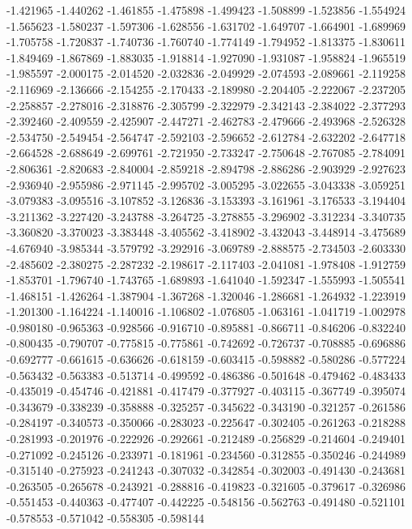 -1.421965
-1.440262
-1.461855
-1.475898
-1.499423
-1.508899
-1.523856
-1.554924
-1.565623
-1.580237
-1.597306
-1.628556
-1.631702
-1.649707
-1.664901
-1.689969
-1.705758
-1.720837
-1.740736
-1.760740
-1.774149
-1.794952
-1.813375
-1.830611
-1.849469
-1.867869
-1.883035
-1.918814
-1.927090
-1.931087
-1.958824
-1.965519
-1.985597
-2.000175
-2.014520
-2.032836
-2.049929
-2.074593
-2.089661
-2.119258
-2.116969
-2.136666
-2.154255
-2.170433
-2.189980
-2.204405
-2.222067
-2.237205
-2.258857
-2.278016
-2.318876
-2.305799
-2.322979
-2.342143
-2.384022
-2.377293
-2.392460
-2.409559
-2.425907
-2.447271
-2.462783
-2.479666
-2.493968
-2.526328
-2.534750
-2.549454
-2.564747
-2.592103
-2.596652
-2.612784
-2.632202
-2.647718
-2.664528
-2.688649
-2.699761
-2.721950
-2.733247
-2.750648
-2.767085
-2.784091
-2.806361
-2.820683
-2.840004
-2.859218
-2.894798
-2.886286
-2.903929
-2.927623
-2.936940
-2.955986
-2.971145
-2.995702
-3.005295
-3.022655
-3.043338
-3.059251
-3.079383
-3.095516
-3.107852
-3.126836
-3.153393
-3.161961
-3.176533
-3.194404
-3.211362
-3.227420
-3.243788
-3.264725
-3.278855
-3.296902
-3.312234
-3.340735
-3.360820
-3.370023
-3.383448
-3.405562
-3.418902
-3.432043
-3.448914
-3.475689
-4.676940
-3.985344
-3.579792
-3.292916
-3.069789
-2.888575
-2.734503
-2.603330
-2.485602
-2.380275
-2.287232
-2.198617
-2.117403
-2.041081
-1.978408
-1.912759
-1.853701
-1.796740
-1.743765
-1.689893
-1.641040
-1.592347
-1.555993
-1.505541
-1.468151
-1.426264
-1.387904
-1.367268
-1.320046
-1.286681
-1.264932
-1.223919
-1.201300
-1.164224
-1.140016
-1.106802
-1.076805
-1.063161
-1.041719
-1.002978
-0.980180
-0.965363
-0.928566
-0.916710
-0.895881
-0.866711
-0.846206
-0.832240
-0.800435
-0.790707
-0.775815
-0.775861
-0.742692
-0.726737
-0.708885
-0.696886
-0.692777
-0.661615
-0.636626
-0.618159
-0.603415
-0.598882
-0.580286
-0.577224
-0.563432
-0.563383
-0.513714
-0.499592
-0.486386
-0.501648
-0.479462
-0.483433
-0.435019
-0.454746
-0.421881
-0.417479
-0.377927
-0.403115
-0.367749
-0.395074
-0.343679
-0.338239
-0.358888
-0.325257
-0.345622
-0.343190
-0.321257
-0.261586
-0.284197
-0.340573
-0.350066
-0.283023
-0.225647
-0.302405
-0.261263
-0.218288
-0.281993
-0.201976
-0.222926
-0.292661
-0.212489
-0.256829
-0.214604
-0.249401
-0.271092
-0.245126
-0.233971
-0.181961
-0.234560
-0.312855
-0.350246
-0.244989
-0.315140
-0.275923
-0.241243
-0.307032
-0.342854
-0.302003
-0.491430
-0.243681
-0.263505
-0.265678
-0.243921
-0.288816
-0.419823
-0.321605
-0.379617
-0.326986
-0.551453
-0.440363
-0.477407
-0.442225
-0.548156
-0.562763
-0.491480
-0.521101
-0.578553
-0.571042
-0.558305
-0.598144
